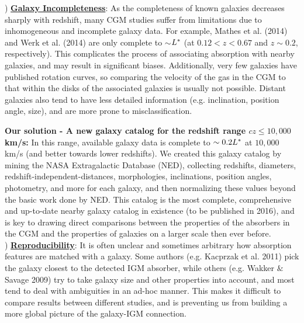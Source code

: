 \documentclass[12pt]{article}
\begin{document}
) \textbf{\underline{Galaxy Incompleteness}}: As the completeness of known galaxies decreases sharply with redshift, many CGM studies suffer from limitations due to inhomogeneous and incomplete galaxy data. For example, Mathes et al. (2014) and Werk et al. (2014) are only complete to $\sim$$L^{\**}$ (at $0.12<z<0.67$ and $z\sim$$0.2$, respectively). This complicates the process of associating absorption with nearby galaxies, and may result in significant biases. Additionally, very few galaxies have published rotation curves, so comparing the velocity of the gas in the CGM to that within the disks of the associated galaxies is usually not possible. Distant galaxies also tend to have less detailed information (e.g. inclination, position angle, size), and are more prone to misclassification.

\textbf{Our solution - A new galaxy catalog for the redshift range $cz \leq 10,000$ km/s:} In this range, available galaxy data is complete to $\sim0.2 L^{\**}$ at $10,000$ km/s (and better towards lower redshifts). We created this galaxy catalog by mining the NASA Extragalactic Database (NED), collecting redshifts, diameters, redshift-independent-distances, morphologies, inclinations, position angles, photometry, and more for each galaxy, and then normalizing these values beyond the basic work done by NED. This catalog is the most complete, comprehensive and up-to-date nearby galaxy catalog in existence (to be published in 2016), and is key to drawing direct comparisons between the properties of the absorbers in the CGM and the properties of galaxies on a larger scale then ever before.\\


) \textbf{\underline{Reproducibility}}: It is often unclear and sometimes arbitrary how absorption features are matched with a galaxy. Some authors (e.g. Kacprzak et al. 2011) pick the galaxy closest to the detected IGM absorber, while others (e.g. Wakker $\&$ Savage 2009) try to take galaxy size and other properties into account, and most tend to deal with ambiguities in an ad-hoc manner. This makes it difficult to compare results between different studies, and is preventing us from building a more global picture of the galaxy-IGM connection.
\end{document}
